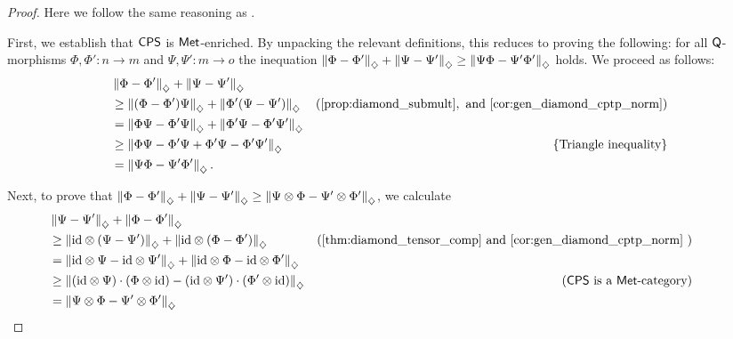\begin{proof}
  Here we follow the same reasoning as \cite[Proof of  Proposition 4.1, Section 4.3]{dahlqvist2023syntactic}.

  First, we establish that $\mathsf{CPS}$ is $\mathsf{Met}$-enriched. By unpacking the relevant definitions, this reduces to proving the following: for all $\mathsf{Q}$-morphisms $\Phi, \Phi' : n \to m$ and $\Psi, \Psi' : m \to o$ the inequation $\left\lVert \Phi-\Phi' \right\rVert_{\diamondsuit} + \left\lVert \Psi-\Psi' \right\rVert_{\diamondsuit} \geq \left\lVert \Psi\Phi-\Psi'\Phi' \right\rVert_{\diamondsuit} $ holds. 
  We proceed as follows:
\begin{align*}
  & \diamondnorm{\Phi - \Phi'} + \diamondnorm{\Psi - \Psi'} \\
&\geq \diamondnorm{(\Phi - \Phi')\Psi} +  \diamondnorm{\Phi'(\Psi - \Psi')}  & (\text{\autoref{prop:diamond_submult}}, \text{ and \autoref{cor:gen_diamond_cptp_norm}}) \\
& = \diamondnorm{\Phi \Psi- \Phi' \Psi} +  \diamondnorm{\Phi'\Psi - \Phi' \Psi'} \\
& \geq  \diamondnorm{\Phi \Psi- \Phi' \Psi + \Phi'\Psi - \Phi' \Psi' }  & \{ \text{Triangle inequality} \} \\
&= \diamondnorm{\Psi\Phi-\Psi'\Phi'}.
\end{align*}

  Next, to prove that  $\left\lVert \Phi-\Phi' \right\rVert_{\diamondsuit} + \left\lVert \Psi-\Psi' \right\rVert_{\diamondsuit} \geq \left\lVert \Psi \otimes \Phi-\Psi' \otimes \Phi' \right\rVert_{\diamondsuit} $, we calculate
  \begin{align*}
      & \hspace{-30pt} \diamondnorm{\Psi - \Psi'} + \diamondnorm{\Phi - \Phi'} \\
      & \hspace{-30pt} \geq \diamondnorm{\id \otimes \left(\Psi-\Psi'\right)} + \diamondnorm{\id \otimes \left(\Phi-\Phi'\right)} & (\text{\autoref{thm:diamond_tensor_comp} and \autoref{cor:gen_diamond_cptp_norm} })  \\
      &\hspace{-30pt} =  \diamondnorm{\id \otimes \Psi- \id \otimes\Psi'} + \diamondnorm{\id \otimes \Phi- \id \otimes\Phi'} \\
      &\hspace{-30pt} \geq \diamondnorm{\left( \id \otimes \Psi \right) \cdot \left( \Phi \otimes \id \right) -  \left( \id \otimes \Psi' \right) \cdot \left( \Phi' \otimes \id \right)} & (\catCPS \text{ is a } \mathsf{Met}\text{-category}) \\
      &\hspace{-30pt} = \diamondnorm{\Psi \otimes \Phi - \Psi' \otimes \Phi'}
  \end{align*}

\end{proof}


